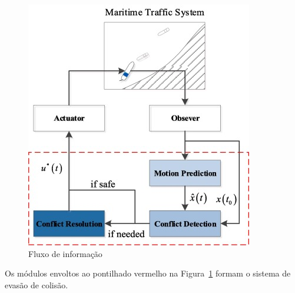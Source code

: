         \begin{figure}
            \centering
            \includegraphics{fig/information_flow.png}
            \caption{Fluxo de informação ~\cite{HUANG2020451}}
            \label{fig:col_avoid_info_flow}
        \end{figure}
        
        Os módulos envoltos ao pontilhado vermelho na Figura~\ref{fig:col_avoid_info_flow} formam o sistema de evasão de colisão. 